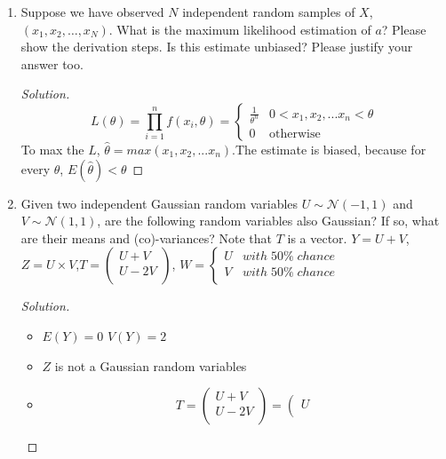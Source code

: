 \documentclass{article}
\newenvironment{solution}
  {\renewcommand\qedsymbol{$\blacksquare$}\begin{proof}[Solution]}
  {\end{proof}}
\begin{document}
\begin{enumerate}
\begin{solution}
\end{solution}
\bigskip
\item 	Suppose we have observed $N$ independent random samples of $X$, $(x_1,x_2,\ldots,x_N)$. What is the maximum likelihood estimation of $a$? Please show the derivation steps. Is this estimate unbiased? Please justify your answer too.
\begin{solution}
    \[
        L(\theta) =
            \prod_{i=1}^n f(x_{i}, \theta) =
                \begin{cases}
                    \frac{1}{{\theta}^{n}}  & \text{$0 < x_{1}, x_{2}, ... x_{n} < \theta$} \\
                    0                       & \text{otherwise}
                \end{cases}
    \]
    To max the $L$, $\hat{\theta} = max(x_{1}, x_{2}, ... x_{n})$.\newline The estimate is
    biased, because for every $\theta$, $E{(\hat{\theta})} < \theta$
\end{solution}
 \bigskip
\item 	Given two independent Gaussian random variables $U\sim\mathcal{N}(-1,1)$ and $V\sim\mathcal{N}(1,1)$, are the following random variables also Gaussian? If so, what are their means and (co)-variances? Note that $T$ is a vector.
$Y=U+V$,$Z=U\times V$,$T=\left(\begin{matrix}U+V\\U-2V\\\end{matrix}\right)$,
$W=\left \{ \begin{matrix}U&with\; 50 \% \; chance\\ V&with\; 50\%\;chance\\ \end{matrix} \right.$
\begin{solution}
    \begin{itemize}
        \item $E(Y) = 0$ $V(Y) = 2$
        \item $Z$ is not a Gaussian random variables
        \item
            \[
                T = \left(
                    \begin{matrix} U+V \\
                        U-2V\\
                    \end{matrix}
                \right)
                 = \left(
                    \begin{matrix} U \\

\end{matrix}\]
\end{itemize}
\end{solution}
\end{enumerate}
\end{document}
